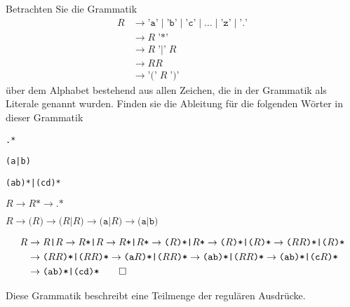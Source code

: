 Betrachten Sie die Grammatik 
\begin{align*}
R&\to \texttt{'a'} \;|\; \texttt{'b'} \;|\; \texttt{'c'} \;|\;\dots\;|\; \texttt{'z'} \;|\; \texttt{'.'}\\
 &\to R\; \texttt{'*'}\\
 &\to R\; \texttt{'|'}\; R\\
 &\to RR\\
 &\to \texttt{'('} \; R \; \texttt{')'}
\end{align*}
über dem Alphabet bestehend aus allen Zeichen, die in der Grammatik als
Literale genannt wurden.
Finden sie die Ableitung für die folgenden Wörter in dieser Grammatik
\begin{teilaufgaben}
\item \texttt{.*}
\item \texttt{(a|b)}
\item \texttt{(ab)*|(cd)*}
\end{teilaufgaben}


\begin{loesung}
\begin{teilaufgaben}
\item
\(
R\to R\texttt{*}\to \texttt{.*}
\)
\item \(
R\to \texttt{(} R\texttt{)}
  \to \texttt{(}R\texttt{|}R\texttt{)}
  \to \texttt{(a|}R\texttt{)}
  \to \texttt{(a|b)}
\)
\item
\begin{align*}
R&\to R\texttt{|}R
  \to R\texttt{*|}R
  \to R\texttt{*|}R\texttt{*}
  \to \texttt{(}R\texttt{)*|}R\texttt{*}
  \to \texttt{(}R\texttt{)*|(}R\texttt{)*}
  \to \texttt{(}RR\texttt{)*|(}R\texttt{)*}
\\
 &\to \texttt{(}RR\texttt{)*|(}RR\texttt{)*}
  \to \texttt{(a}R\texttt{)*|(}RR\texttt{)*}
  \to \texttt{(ab)*|(}RR\texttt{)*}
  \to \texttt{(ab)*|(c}R\texttt{)*}
\\
 &\to \texttt{(ab)*|(cd)*}
\qedhere
\end{align*}
\end{teilaufgaben}
\end{loesung}

\begin{diskussion}
Diese Grammatik beschreibt eine Teilmenge der regulären Ausdrücke.
\end{diskussion}


